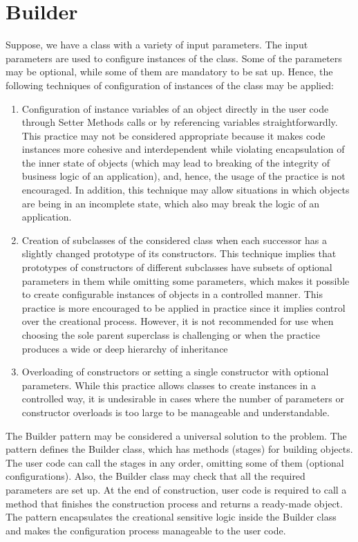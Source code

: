 \documentclass[12pt]{book}
\begin{document}
\section{Builder}
Suppose, we have a class with a variety of input parameters. The input parameters are used to configure instances of the class. Some of the parameters may be optional, while some of them are mandatory to be sat up. Hence, the following techniques of configuration of instances of the class may be applied:
\begin{enumerate}
    \item Configuration of instance variables of an object directly in the user code through Setter Methods calls or by referencing variables straightforwardly. This practice may not be considered appropriate because it makes code instances more cohesive and interdependent while violating encapsulation of the inner state of objects (which may lead to breaking of the integrity of business logic of an application), and, hence, the usage of the practice is not encouraged. In addition, this technique may allow situations in which objects are being in an incomplete state, which also may break the logic of an application.
    \item Creation of subclasses of the considered class when each successor has a slightly changed prototype of its constructors. This technique implies that prototypes of constructors of different subclasses have subsets of optional parameters in them while omitting some parameters, which makes it possible to create configurable instances of objects in a controlled manner. This practice is more encouraged to be applied in practice since it implies control over the creational process. However, it is not recommended for use when choosing the sole parent superclass is challenging or when the practice produces a wide or deep hierarchy of inheritance
    \item Overloading of constructors or setting a single constructor with optional parameters. While this practice allows classes to create instances in a controlled way, it is undesirable in cases where the number of parameters or constructor overloads is too large to be manageable and understandable.
\end{enumerate}

The Builder pattern may be considered a universal solution to the problem. The pattern defines the Builder class, which has methods (stages) for building objects. The user code can call the stages in any order, omitting some of them (optional configurations). Also, the Builder class may check that all the required parameters are set up. At the end of construction, user code is required to call a method that finishes the construction process and returns a ready-made object. The pattern encapsulates the creational sensitive logic inside the Builder class and makes the configuration process manageable to the user code.
\end{document}
